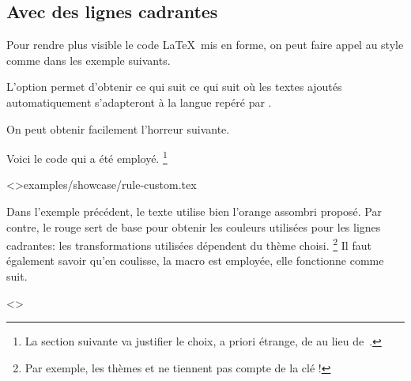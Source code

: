 \documentclass{../main/main}
\begin{document}
\subsection{Avec des lignes cadrantes}

Pour rendre plus visible le code \LaTeX\ mis en forme, on peut faire appel au style  comme dans les exemple suivants.


\begin{tdocexa}
	L'option  permet d'obtenir ce qui suit ce qui suit où les textes ajoutés automatiquement s'adapteront à la langue repéré par \thisproj.

	
\end{tdocexa}


\begin{tdocexa}
	On peut obtenir facilement l'horreur suivante.

	

	Voici le code qui a été employé.%
	\footnote{
		La section suivante va justifier le choix, a priori étrange, de  au lieu de \,.
	}

	\tdoclatexinput<>{examples/showcase/rule-custom.tex}
\end{tdocexa}


\begin{tdocnote}
    Dans l'exemple précédent, le texte utilise bien l'orange assombri proposé. Par contre, le rouge sert de base pour obtenir les couleurs utilisées pour les lignes cadrantes: les transformations utilisées dépendent du thème choisi.%
    \footnote{
        Par exemple, les thèmes  et  ne tiennent pas compte de la clé  !
    }
    Il faut également savoir qu'en coulisse, la macro  est employée, elle fonctionne comme suit.

    \begin{tdoclatex}<>
    \end{tdoclatex}
\end{tdocnote}
\end{document}
